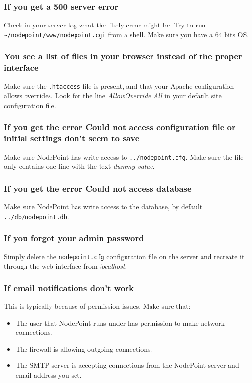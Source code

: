 \documentclass[11pt]{article}
\begin{document}
{
\subsubsection{If you get a 500 server error}

Check in your server log what the likely error might be. Try to run \texttt{\textasciitilde/nodepoint/www/nodepoint.cgi} from a shell. Make sure you have a 64 bits OS.

\subsubsection{You see a list of files in your browser instead of the proper interface}

Make sure the \texttt{.htaccess} file is present, and that your Apache configuration allows overrides. Look for the line \textit{AllowOverride All} in your default site configuration file.

\subsubsection{If you get the error Could not access configuration file or initial settings don't seem to save}

Make sure NodePoint has write access to \texttt{../nodepoint.cfg}. Make sure the file only contains one line with the text \textit{dummy value}.

\subsubsection{If you get the error Could not access database}

Make sure NodePoint has write access to the database, by default \texttt{../db/nodepoint.db}.

\subsubsection{If you forgot your admin password}

Simply delete the \texttt{nodepoint.cfg} configuration file on the server and recreate it through the web interface from \textit{localhost}.
}

\subsubsection{If email notifications don't work}

This is typically because of permission issues. Make sure that:
\begin{itemize}
\item The user that NodePoint runs under has permission to make network connections.
\item The firewall is allowing outgoing connections.
\item The SMTP server is accepting connections from the NodePoint server and email address you set.
\end{itemize}
\end{document}
